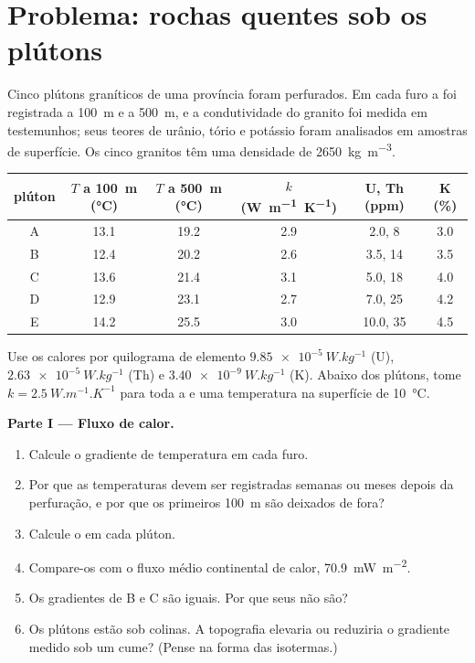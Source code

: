 \section{Problema: rochas quentes sob os plútons}

\begin{problem}
\label{pb:b1:heat-budget:1}
Cinco plútons graníticos de uma província foram perfurados. Em cada furo a  foi registrada a \qty{100}{m} e a \qty{500}{m}, e a condutividade do granito foi medida em testemunhos; seus teores de urânio, tório e
potássio foram analisados em amostras de superfície. Os cinco granitos têm uma
densidade de \qty{2650}{kg.m^{-3}}.
\begin{center}
\small
\begin{tabular}{cccccc}
\hline
plúton & $T$ a \qty{100}{m} (\unit{\degreeCelsius}) & $T$ a \qty{500}{m} (\unit{\degreeCelsius}) & $k$ (\unit{W.m^{-1}.K^{-1}}) & U, Th (ppm) & K (\unit{\percent}) \\
\hline
A & 13.1 & 19.2 & 2.9 & 2.0, 8 & 3.0 \\
B & 12.4 & 20.2 & 2.6 & 3.5, 14 & 3.5 \\
C & 13.6 & 21.4 & 3.1 & 5.0, 18 & 4.0 \\
D & 12.9 & 23.1 & 2.7 & 7.0, 25 & 4.2 \\
E & 14.2 & 25.5 & 3.0 & 10.0, 35 & 4.5 \\
\hline
\end{tabular}
\end{center}
Use os calores por quilograma de elemento $\qty{9.85e-5}{W.kg^{-1}}$ (U), $\qty{2.63e-5}{W.kg^{-1}}$
(Th) e $\qty{3.40e-9}{W.kg^{-1}}$ (K). Abaixo dos plútons, tome
$k = \qty{2.5}{W.m^{-1}.K^{-1}}$ para toda a  e uma temperatura na superfície de
\qty{10}{\degreeCelsius}.

\medskip
\noindent\textbf{Parte I --- Fluxo de calor.}
\begin{enumerate}
  \item Calcule o gradiente de temperatura em cada furo.
  \item Por que as temperaturas devem ser registradas semanas ou meses depois da perfuração, e
        por que os primeiros \qty{100}{m} são deixados de fora?
  \item Calcule o  em cada plúton.
  \item Compare-os com o fluxo médio continental de calor, \qty{70.9}{mW.m^{-2}}.
  \item Os gradientes de B e C são iguais. Por que seus  não são?
  \item Os plútons estão sob colinas. A topografia elevaria ou reduziria o
        gradiente medido sob um cume? (Pense na forma das isotermas.)
\end{enumerate}


\end{problem}
